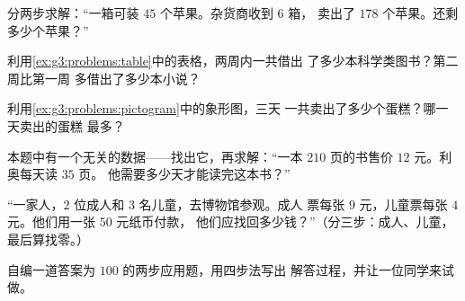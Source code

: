 \begin{exercise}[$\star$]\label{exo:g3:problems:6}
分两步求解：“一箱可装 $45$ 个苹果。杂货商收到 $6$ 箱，
卖出了 $178$ 个苹果。还剩多少个苹果？”
\end{exercise}

\begin{exercise}[$\star$]\label{exo:g3:problems:7}
利用\cref{ex:g3:problems:table}中的表格，两周内一共借出
了多少本科学类图书？第二周比第一周
多借出了多少本小说？
\end{exercise}

\begin{exercise}[$\star$]\label{exo:g3:problems:8}
利用\cref{ex:g3:problems:pictogram}中的象形图，三天
一共卖出了多少个蛋糕？哪一天卖出的蛋糕
最多？
\end{exercise}

\begin{exercise}[$\star$]\label{exo:g3:problems:9}
本题中有一个无关的数据——找出它，再求解：“一本
$210$ 页的书售价 $12$ 元。利奥每天读 $35$ 页。
他需要多少天才能读完这本书？”
\end{exercise}

\begin{exercise}[$\star\star$]\label{exo:g3:problems:10}
“一家人，$2$ 位成人和 $3$ 名儿童，去博物馆参观。成人
票每张 $9$ 元，儿童票每张 $4$ 元。他们用一张 $50$ 元纸币付款，
他们应找回多少钱？”（分三步：成人、儿童，
最后算找零。）
\end{exercise}

\begin{exercise}[$\star\star$]\label{exo:g3:problems:11}
自编一道答案为 $100$ 的两步应用题，用四步法写出
解答过程，并让一位同学来试做。
\end{exercise}
